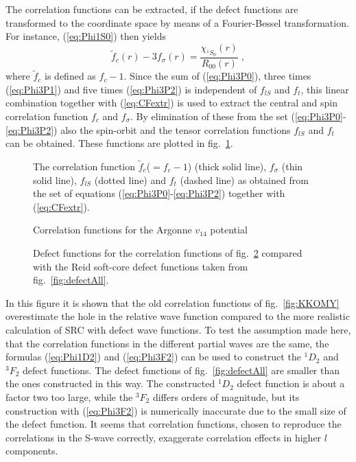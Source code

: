 %
The correlation functions can be extracted, if the defect functions are 
transformed to the coordinate space by means of a Fourier-Bessel transformation.
For instance, (\ref{eq:Phi1S0}) then yields
%
	\begin{equation}
		\tilde{f}_c(r) - 3f_\sigma (r)
	=
		\frac {\chi_{^1S_0}(r)}
		      {R_{00}(r)}
	\label{eq:CFextr}
	\;,
	\end{equation}
%
where $\tilde{f}_c$ is defined as $f_c -1$. 
Since the sum of (\ref{eq:Phi3P0}), three times (\ref{eq:Phi3P1}) 
and five times  (\ref{eq:Phi3P2}) 
is independent of $f_{lS}$ and $f_t$, this linear combination together with
(\ref{eq:CFextr}) is used to extract the central and spin correlation 
function $f_c$ and $f_\sigma$. 
By elimination of these from the set (\ref{eq:Phi3P0}-\ref{eq:Phi3P2}) also the 
spin-orbit and the tensor correlation functions $f_{lS}$ and $f_t$ can 
be obtained. 
These functions are plotted in fig.~\ref{fig:def2cor1}.
\begin{figure}
\centerline{
}
\vspace{0.5cm}
\caption[]{ The correlation function $\tilde{f}_c$($=f_c-1$) (thick solid line),
$f_\sigma$ (thin solid line), $f_{lS}$ (dotted line) and $f_t$ (dashed line) 
as obtained from the set of equations (\ref{eq:Phi3P0}-\ref{eq:Phi3P2}) 
together with (\ref{eq:CFextr}).
\label{fig:def2cor1}
}
\end{figure}
\begin{figure}
\centerline{
}
\vspace{0.5cm}
\caption[]{Correlation functions for the Argonne $v_{14}$ potential\cite{PWP92}
\label{fig:corArg}
}
\end{figure}
\begin{figure}
\centerline{
}
\vspace{0.5cm}
\caption[]{Defect functions for the correlation functions of 
fig.~\ref{fig:corArg} compared with the Reid soft-core defect functions taken 
from fig.~\ref{fig:defectAll}.
\label{fig:defectPiep}
}
\end{figure}
In this figure it is shown that the old correlation functions of 
fig.~\ref{fig:KKOMY} overestimate the hole in the relative wave function 
compared
to the more realistic calculation of SRC with defect wave functions.
To test the assumption made here, that the correlation functions in the 
different partial waves 
are the same, the formulas (\ref{eq:Phi1D2}) and (\ref{eq:Phi3F2}) 
can be used to construct the ${}^1D_2$ and ${}^3F_2$ defect functions.  
The defect functions of fig.~\ref{fig:defectAll} are smaller than the 
ones constructed in this way.
The constructed ${}^1D_2$ defect function is about a 
factor two too large, while the ${}^3F_2$ differs orders of magnitude, 
but its construction with (\ref{eq:Phi3F2}) is numerically inaccurate
due to the small size of the defect function.
It seems that correlation functions, chosen to reproduce the correlations in 
the 
S-wave correctly, exaggerate correlation effects in higher $l$ components.

